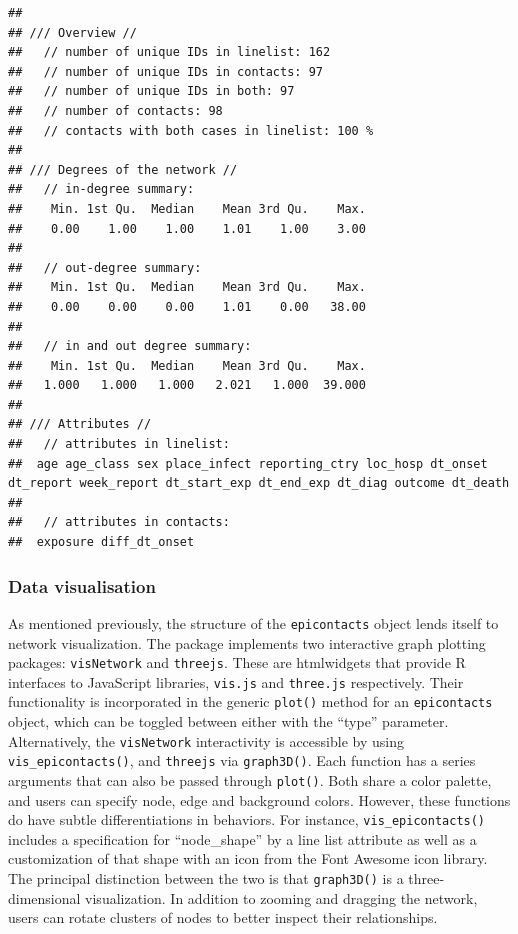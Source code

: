 \documentclass[9pt,a4paper,]{extarticle}
\theoremstyle{definition}
\theoremstyle{definition}
\theoremstyle{definition}
\theoremstyle{remark}
\begin{document}
\begin{verbatim}
## 
## /// Overview //
##   // number of unique IDs in linelist: 162
##   // number of unique IDs in contacts: 97
##   // number of unique IDs in both: 97
##   // number of contacts: 98
##   // contacts with both cases in linelist: 100 %
## 
## /// Degrees of the network //
##   // in-degree summary:
##    Min. 1st Qu.  Median    Mean 3rd Qu.    Max. 
##    0.00    1.00    1.00    1.01    1.00    3.00 
## 
##   // out-degree summary:
##    Min. 1st Qu.  Median    Mean 3rd Qu.    Max. 
##    0.00    0.00    0.00    1.01    0.00   38.00 
## 
##   // in and out degree summary:
##    Min. 1st Qu.  Median    Mean 3rd Qu.    Max. 
##   1.000   1.000   1.000   2.021   1.000  39.000 
## 
## /// Attributes //
##   // attributes in linelist:
##  age age_class sex place_infect reporting_ctry loc_hosp dt_onset dt_report week_report dt_start_exp dt_end_exp dt_diag outcome dt_death
## 
##   // attributes in contacts:
##  exposure diff_dt_onset
\end{verbatim}

\subsubsection{Data visualisation}\label{data-visualisation}

As mentioned previously, the structure of the \texttt{epicontacts} object lends itself to network visualization. The package implements two interactive graph plotting packages: \texttt{visNetwork} and \texttt{threejs}\citep{visNetwork}\citep{threejs}. These are htmlwidgets that provide R interfaces to JavaScript libraries, \texttt{vis.js} and \texttt{three.js} respectively. Their functionality is incorporated in the generic \texttt{plot()} method for an \texttt{epicontacts} object, which can be toggled between either with the ``type'' parameter. Alternatively, the \texttt{visNetwork} interactivity is accessible by using \texttt{vis\_epicontacts()}, and \texttt{threejs} via \texttt{graph3D()}. Each function has a series arguments that can also be passed through \texttt{plot()}. Both share a color palette, and users can specify node, edge and background colors. However, these functions do have subtle differentiations in behaviors. For instance, \texttt{vis\_epicontacts()} includes a specification for ``node\_shape'' by a line list attribute as well as a customization of that shape with an icon from the Font Awesome icon library. The principal distinction between the two is that \texttt{graph3D()} is a three-dimensional visualization. In addition to zooming and dragging the network, users can rotate clusters of nodes to better inspect their relationships.
\end{document}
